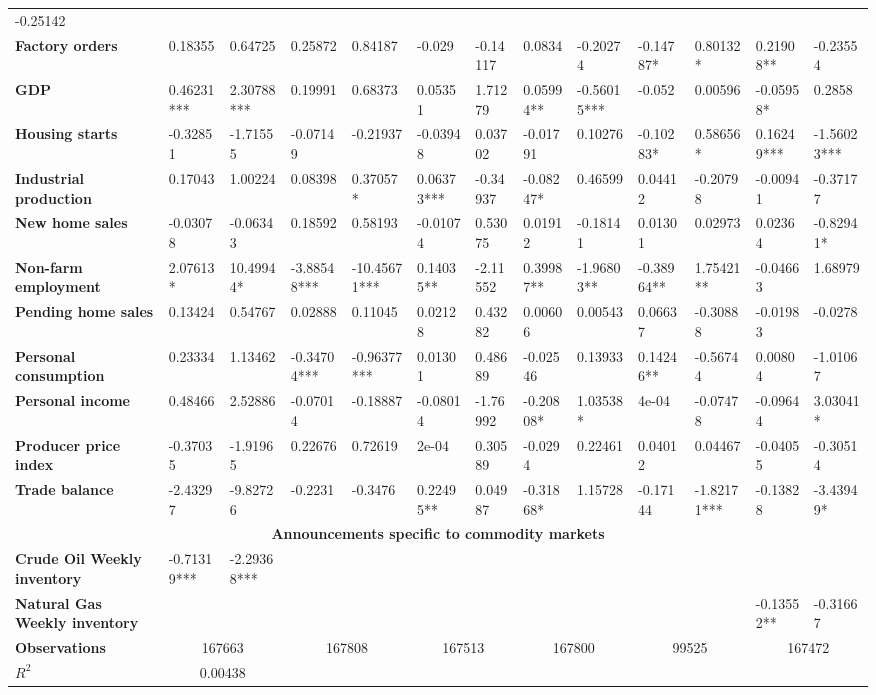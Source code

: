 \begin{sidewaystable}
{\begin{tabular}{@{}lllllllllllll@{}}
-0.25142 \\ \textbf{Factory orders}& 0.18355 & 0.64725 & 0.25872 & 0.84187 & -0.029 & -0.14117 & 0.0834 & -0.20274 & -0.14787* & 0.80132* & 0.21908** & -0.23554 \\ \textbf{GDP}& 0.46231*** & 2.30788*** & 0.19991 & 0.68373 & 0.05351 & 1.71279 & 0.05994** & -0.56015*** & -0.052 & 0.00596 & -0.05958* & 0.2858 \\ \textbf{Housing starts}& -0.32851 & -1.71555 & -0.07149 & -0.21937 & -0.03948 & 0.03702 & -0.01791 & 0.10276 & -0.10283* & 0.58656* & 0.16249*** & -1.56023*** \\ \textbf{Industrial production}& 0.17043 & 1.00224 & 0.08398 & 0.37057* & 0.06373***& -0.34937 & -0.08247* & 0.46599 & 0.04412 & -0.20798 & -0.00941 & -0.37177 \\ \textbf{New home sales}& -0.03078 & -0.06343 & 0.18592 & 0.58193 & -0.01074 & 0.53075 & 0.01912 & -0.18141 & 0.01301 & 0.02973 & 0.02364 & -0.82941* \\ \textbf{Non-farm employment}& 2.07613*& 10.49944*& -3.88548*** & -10.45671*** & 0.14035**& -2.11552 & 0.39987** & -1.96803** & -0.38964** & 1.75421** & -0.04663 & 1.68979 \\ \textbf{Pending home sales}& 0.13424 & 0.54767 & 0.02888 & 0.11045 & 0.02128 & 0.43282 & 0.00606 & 0.00543 & 0.06637 & -0.30888 & -0.01983 & -0.0278 \\ \textbf{Personal consumption}& 0.23334 & 1.13462 & -0.34704*** & -0.96377*** & 0.01301 & 0.48689 & -0.02546 & 0.13933 & 0.14246** & -0.56744 & 0.00804 & -1.01067 \\ \textbf{Personal income}& 0.48466 & 2.52886 & -0.07014 & -0.18887 & -0.08014 & -1.76992 & -0.20808* & 1.03538* & 4e-04 & -0.07478 & -0.09644 & 3.03041* \\ \textbf{Producer price index}& -0.37035 & -1.91965 & 0.22676 & 0.72619 & 2e-04 & 0.30589 & -0.0294 & 0.22461 & 0.04012 & 0.04467 & -0.04055 & -0.30514 \\ \textbf{Trade balance}& -2.43297 & -9.82726 & -0.2231 & -0.3476 & 0.22495**& 0.04987 & -0.31868* & 1.15728 & -0.17144 & -1.82171*** & -0.13828 & -3.43949* \\  \midrule \multicolumn{13}{c}{\textbf{Announcements specific to commodity markets}} \\ \midrule \textbf{Crude Oil Weekly inventory}& -0.71319*** & -2.29368*** &  &  &  &  &  &  &  &  &  &  \\ \textbf{Natural Gas Weekly inventory}&  &  &  &  &  &  &  &  &  &  & -0.13552** & -0.31667 \\  \midrule \textbf{Observations}             &\multicolumn{2}{c}{ 167663 }                                                 & \multicolumn{2}{c}{ 167808 }                                                 & \multicolumn{2}{c}{ 167513 }                                                 & \multicolumn{2}{c}{ 167800 }                                                 & \multicolumn{2}{c}{ 99525 }                                                   & \multicolumn{2}{c}{ 167472 }                                                 \\ \textbf{$R^2$}             &\multicolumn{2}{c}{ 0.00438 }                   
\end{tabular}}
\end{sidewaystable}
